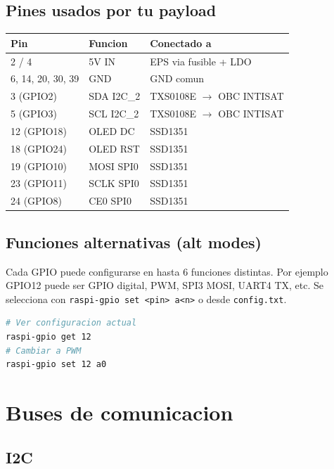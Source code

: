 \documentclass[11pt,a4paper,oneside]{report}
\begin{document}
\section{Pines usados por tu payload}

\begin{center}
\begin{tabular}{lll}
\toprule
\textbf{Pin} & \textbf{Funcion} & \textbf{Conectado a} \\
\midrule
2 / 4   & 5V IN              & EPS via fusible + LDO \\
6, 14, 20, 30, 39 & GND      & GND comun \\
3 (GPIO2) & SDA I2C\_2        & TXS0108E $\to$ OBC INTISAT \\
5 (GPIO3) & SCL I2C\_2        & TXS0108E $\to$ OBC INTISAT \\
12 (GPIO18) & OLED DC         & SSD1351 \\
18 (GPIO24) & OLED RST        & SSD1351 \\
19 (GPIO10) & MOSI SPI0       & SSD1351 \\
23 (GPIO11) & SCLK SPI0       & SSD1351 \\
24 (GPIO8)  & CE0 SPI0        & SSD1351 \\
\bottomrule
\end{tabular}
\end{center}

\section{Funciones alternativas (alt modes)}

Cada GPIO puede configurarse en hasta 6 funciones distintas. Por ejemplo
GPIO12 puede ser GPIO digital, PWM, SPI3 MOSI, UART4 TX, etc. Se selecciona
con \texttt{raspi-gpio set <pin> a<n>} o desde \texttt{config.txt}.

\begin{lstlisting}[language=bash]
# Ver configuracion actual
raspi-gpio get 12
# Cambiar a PWM
raspi-gpio set 12 a0
\end{lstlisting}

\chapter{Buses de comunicacion}

\section{I2C}
\end{document}
